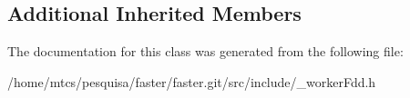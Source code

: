 \subsection*{Additional Inherited Members}


The documentation for this class was generated from the following file\+:\begin{DoxyCompactItemize}
\item 
/home/mtcs/pesquisa/faster/faster.\+git/src/include/\+\_\+worker\+Fdd.\+h\end{DoxyCompactItemize}
